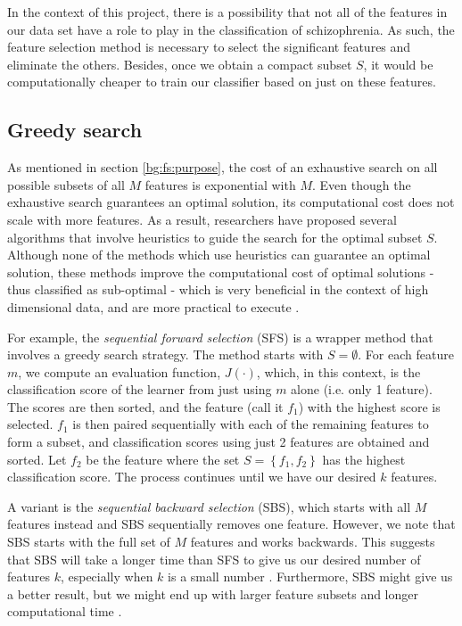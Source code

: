 \documentclass[12pt, twoside, a4paper]{report}
\begin{document}
In the context of this project, there is a possibility that not all of the features in our data set have a role to play in the classification of schizophrenia. As such, the feature selection method is necessary to select the significant features and eliminate the others. Besides, once we obtain a compact subset $S$, it would be computationally cheaper to train our classifier based on just on these features.


\subsection{Greedy search} \label{bg:fs:greedy}
As mentioned in section \ref{bg:fs:purpose}, the cost of an exhaustive search on all possible subsets of all $M$ features is exponential with $M$. Even though the exhaustive search guarantees an optimal solution, its computational cost does not scale with more features. As a result, researchers have proposed several algorithms that involve heuristics to guide the search for the optimal subset $S$. Although none of the methods which use heuristics can guarantee an optimal solution, these methods improve the computational cost of optimal solutions - thus classified as sub-optimal - which is very beneficial in the context of high dimensional data, and are more practical to execute \cite{RefWorks:140, RefWorks:182}.

For example, the \textit{sequential forward selection} (SFS) \cite{RefWorks:177} is a wrapper method that involves a greedy search strategy. The method starts with $S=\emptyset$. For each feature $m$, we compute an evaluation function, $J(\cdot)$, which, in this context, is the classification score of the learner from just using $m$ alone (i.e. only 1 feature). The scores are then sorted, and the feature (call it $f_1$) with the highest score is selected. $f_1$ is then paired sequentially with each of the remaining features to form a subset, and classification scores using just 2 features are obtained and sorted. Let $f_2$ be the feature where the set $S= \left\lbrace f_1, f_2 \right\rbrace$ has the highest classification score. The process continues until we have our desired $k$ features.
  
A variant is the \textit{sequential backward selection} (SBS), which starts with all $M$ features instead and SBS sequentially removes one feature. However, we note that SBS starts with the full set of $M$ features and works backwards. This suggests that SBS will take a longer time than SFS to give us our desired number of features $k$, especially when $k$ is a small number \cite{RefWorks:190}. Furthermore, SBS might give us a better result, but we might end up with larger feature subsets and longer computational time \cite{RefWorks:208}.
\end{document}

